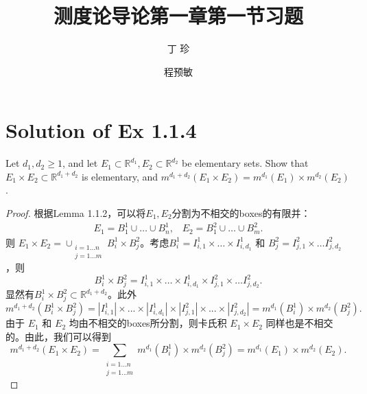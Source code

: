 \documentclass[reqno,a4paper,14pt]{amsart}
\title{\textbf{测度论导论第一章第一节习题}}
\author{丁\;\;\; 珍}
\author{程预敏}
\newcommand{\abs}[1]{\left\vert#1\right\vert}
\begin{document}
\maketitle
\section{Solution of Ex 1.1.4}
Let $d_1,d_2\geq 1$, and let $E_1\subset \mathbb{R}^{d_1},E_2\subset \mathbb{R}^{d_2}$ be elementary sets. Show that $E_1\times E_2\subset \mathbb{R}^{d_1+d_2}$ is elementary, and $m^{d_1+d_2}(E_1\times E_2)=m^{d_1}(E_1)\times m^{d_2}(E_2)$.
\begin{proof}
    
    根据Lemma 1.1.2，可以将$E_1,E_2$分割为不相交的boxes的有限并：
    \begin{equation*}
        \begin{split}
            E_1=B_1^1\cup \dots \cup B^1_n,\;\;\;E_2=B_1^2\cup \dots \cup B_m^2.
        \end{split}
    \end{equation*}
    则 $E_1\times E_2=\cup_{\substack{i=1...n\\j=1...m}}B_i^1\times B_j^2$。考虑$B_i^1=I^1_{i,1}\times \dots \times I^1_{i,d_1}$ 和 $B_j^2=I^2_{j,1}\times \dots I^2_{j,d_2}$，则
    \begin{equation*}
        B_i^1\times B_j^2=I^1_{i,1}\times \dots \times I^1_{i,d_1}\times I^2_{j,1}\times \dots I^2_{j,d_2}.
    \end{equation*}
    显然有$B^1_i\times B^2_j\subset \mathbb{R}^{d_1+d_2}$。此外
    \begin{equation*}
        m^{d_1+d_2}(B^1_i\times B^2_j)=\abs{I^1_{i,1}}\times ...\times \abs{I^1_{i,d_1}}\times \abs{I^2_{j,1}}\times ...\times \abs{I^2_{j,d_2}}=m^{d_1}(B^1_i)\times m^{d_2}(B^2_j).
    \end{equation*}
    由于 $E_1$ 和 $E_2$ 均由不相交的boxes所分割，则卡氏积 $E_1\times E_2$ 同样也是不相交的。由此，我们可以得到
    \begin{equation*}
        m^{d_1+d_2}(E_1\times E_2)=\sum_{\substack{i=1...n\\j=1...m}}m^{d_1}(B^1_i)\times m^{d_2}(B^2_j)=m^{d_1}(E_1)\times m^{d_2}(E_2).
    \end{equation*}
\end{proof}
\end{document}
